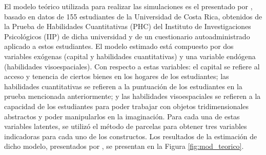 \documentclass[english]{revcoles}
\begin{document}
El modelo teórico utilizada para realizar las simulaciones es el presentado por , basado en datos de 155 estudiantes de la Universidad de Costa Rica, obtenidos de la Prueba de Habilidades Cuantitativas (PHC) del Instituto de Investigaciones Psicológicos (IIP) de dicha universidad y de un cuestionario autoadministrado aplicado a estos estudiantes. El modelo estimado está compuesto por dos variables exógenas (capital y habilidades cuantitativas) y una variable endógena (habilidades visoespaciales). Con respecto a estas variables: el capital se refiere al acceso y tenencia de ciertos bienes en los hogares de los estudiantes; las habilidades cuantitativas se refieren a la puntuación de los estudiantes en la prueba mencionada anteriormente; y las habilidades visoespaciales se refieren a la capacidad de los estudiantes para poder trabajar con objetos tridimensionales abstractos y poder manipularlos en la imaginación. Para cada una de estas variables latentes, se utilizó el método de parcelas para obtener tres variables indicadoras para cada uno de los constructos. Los resultados de la estimación de dicho modelo, presentados por , se presentan en la Figura \ref{fig:mod_teorico}.
\end{document}
